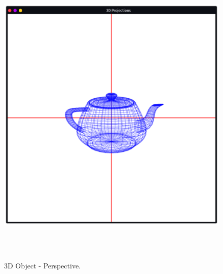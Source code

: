 \documentclass[12pt, a4]{article}
\begin{document}
\subsection*{}
\begin{figure}[h]
\centering
\caption{3D Object - Perspective.}
\includegraphics[height=15cm, width=15cm]{Outputs/Perspective1.png}
\end{figure}

\newpage
\end{document}

